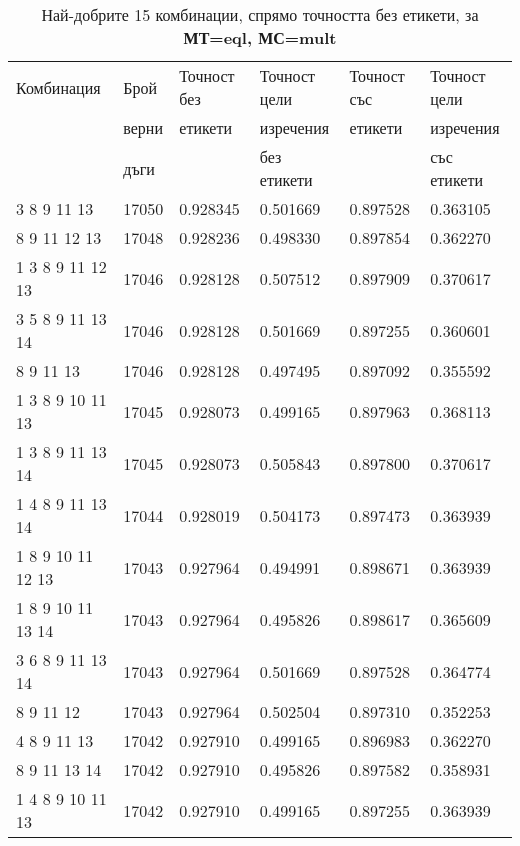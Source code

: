 \begin{table}[!htb] 
\caption{Най-добрите 15 комбинации, спрямо точността без етикети, за \textbf{МТ=eql, МС=mult}}
  \begin{tabular}{|l|l|l|l|l|l|}
\hline 
Комбинация & Брой  & Точност без  & Точност цели  & Точност със  & Точност цели  \\
 & верни	& етикети & изречения & етикети & изречения \\
 & дъги	& 	& без етикети & 	& със етикети \\
\hline 
3 8 9 11 13 &	17050 &	0.928345 &	0.501669 &	0.897528 &	0.363105\\ 
\hline 
8 9 11 12 13 &	17048 &	0.928236 &	0.498330 &	0.897854 &	0.362270\\ 
\hline 
1 3 8 9 11 12 13 &	17046 &	0.928128 &	0.507512 &	0.897909 &	0.370617\\ 
\hline 
3 5 8 9 11 13 14 &	17046 &	0.928128 &	0.501669 &	0.897255 &	0.360601\\ 
\hline 
8 9 11 13 &	17046 &	0.928128 &	0.497495 &	0.897092 &	0.355592\\ 
\hline 
1 3 8 9 10 11 13 &	17045 &	0.928073 &	0.499165 &	0.897963 &	0.368113\\ 
\hline 
1 3 8 9 11 13 14 &	17045 &	0.928073 &	0.505843 &	0.897800 &	0.370617\\ 
\hline 
1 4 8 9 11 13 14 &	17044 &	0.928019 &	0.504173 &	0.897473 &	0.363939\\ 
\hline 
1 8 9 10 11 12 13 &	17043 &	0.927964 &	0.494991 &	0.898671 &	0.363939\\ 
\hline 
1 8 9 10 11 13 14 &	17043 &	0.927964 &	0.495826 &	0.898617 &	0.365609\\ 
\hline 
3 6 8 9 11 13 14 &	17043 &	0.927964 &	0.501669 &	0.897528 &	0.364774\\ 
\hline 
8 9 11 12 &	17043 &	0.927964 &	0.502504 &	0.897310 &	0.352253\\ 
\hline 
4 8 9 11 13 &	17042 &	0.927910 &	0.499165 &	0.896983 &	0.362270\\ 
\hline 
8 9 11 13 14 &	17042 &	0.927910 &	0.495826 &	0.897582 &	0.358931\\ 
\hline 
1 4 8 9 10 11 13 &	17042 &	0.927910 &	0.499165 &	0.897255 &	0.363939\\ 
\hline 
 \end{tabular}
 \label{tab:lab_mult_eql}
 \end{table}